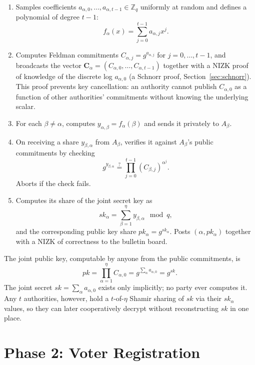 \documentclass[12pt,a4paper,oneside]{report}
\begin{document}
\begin{enumerate}
    \item Samples coefficients $a_{\alpha,0}, \ldots, a_{\alpha,t-1} \in \mathbb{Z}_q$ 
    uniformly at random and defines a polynomial of degree $t - 1$:
    \[
        f_\alpha(x) = \sum_{j=0}^{t-1} a_{\alpha, j} x^j.
    \]
    
    \item Computes Feldman commitments $C_{\alpha,j} = g^{a_{\alpha,j}}$ for 
    $j = 0, \ldots, t-1$, and broadcasts the vector 
    $\mathbf{C}_\alpha = (C_{\alpha, 0}, \ldots, C_{\alpha, t-1})$ together 
    with a NIZK proof of knowledge of the discrete log $a_{\alpha, 0}$ 
    (a Schnorr proof, Section~\ref{sec:schnorr}). This proof prevents 
    key cancellation: an authority cannot publish $C_{\alpha, 0}$ as a 
    function of other authorities' commitments without knowing the 
    underlying scalar.
    
    \item For each $\beta \ne \alpha$, computes $y_{\alpha, \beta} = f_\alpha(\beta)$ 
    and sends it privately to $A_\beta$.
    
    \item On receiving a share $y_{\beta, \alpha}$ from $A_\beta$, verifies it 
    against $A_\beta$'s public commitments by checking
    \[
        g^{y_{\beta, \alpha}} \stackrel{?}{=} \prod_{j=0}^{t-1} (C_{\beta, j})^{\alpha^j}.
    \]
    Aborts if the check fails.
    
    \item Computes its share of the joint secret key as
    \[
        sk_\alpha = \sum_{\beta=1}^{\eta} y_{\beta, \alpha} \mod q,
    \]
    and the corresponding public key share $pk_\alpha = g^{sk_\alpha}$. 
    Posts $(\alpha, pk_\alpha)$ together with a NIZK of correctness to 
    the bulletin board.
\end{enumerate}

The joint public key, computable by anyone from the public commitments, 
is
\[
    pk = \prod_{\alpha=1}^{\eta} C_{\alpha, 0} = g^{\sum_\alpha a_{\alpha, 0}} = g^{sk}.
\]
The joint secret $sk = \sum_\alpha a_{\alpha, 0}$ exists only implicitly; 
no party ever computes it. Any $t$ authorities, however, hold a 
$t$-of-$\eta$ Shamir sharing of $sk$ via their $sk_\alpha$ values, so 
they can later cooperatively decrypt without reconstructing $sk$ in 
one place.

\section{Phase 2: Voter Registration}
\label{sec:phase-2-registration}
\end{document}
